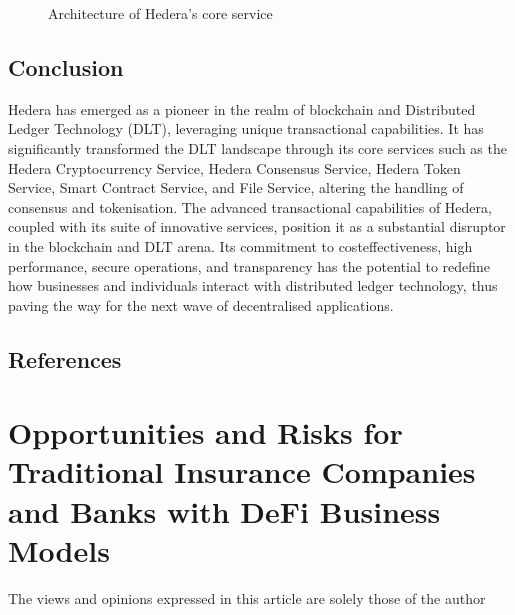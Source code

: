 \documentclass[letterpaper,10pt,english]{jupyterBook}
\let\sphinxpxdimen\pdfpxdimen\else\newdimen\sphinxpxdimen
\begin{document}
\begin{figure}[htbp]
\centering
\capstart

\noindent\sphinxincludegraphics[width=700\sphinxpxdimen,height=450\sphinxpxdimen]{{servicesarchitecture}.png}
\caption{Architecture of Hedera’s core service}\label{\detokenize{HED/hed:hed-service-diagram}}\end{figure}


\subsection{Conclusion}
\label{\detokenize{HED/hed:conclusion}}


\sphinxAtStartPar
Hedera has emerged as a pioneer in the realm of blockchain and Distributed Ledger Technology (DLT), leveraging unique transactional capabilities. It has significantly transformed the DLT landscape through its core services such as the Hedera Cryptocurrency Service, Hedera Consensus Service, Hedera Token Service, Smart Contract Service, and File Service, altering the handling of consensus and tokenisation. The advanced transactional capabilities of Hedera, coupled with its suite of innovative services, position it as a substantial disruptor in the blockchain and DLT arena. Its commitment to cost\sphinxhyphen{}effectiveness, high performance, secure operations, and transparency has the potential to redefine how businesses and individuals interact with distributed ledger technology, thus paving the way for the next wave of decentralised applications.




\subsection{References}
\label{\detokenize{HED/hed:references}}
\sphinxstepscope


\section{Opportunities and Risks for Traditional Insurance Companies and Banks with DeFi Business Models}
\label{\detokenize{BOER/boer:opportunities-and-risks-for-traditional-insurance-companies-and-banks-with-defi-business-models}}\label{\detokenize{BOER/boer::doc}}
\sphinxAtStartPar
{}

\sphinxAtStartPar
{} The views and opinions expressed in this article are solely those of the author
\end{document}
